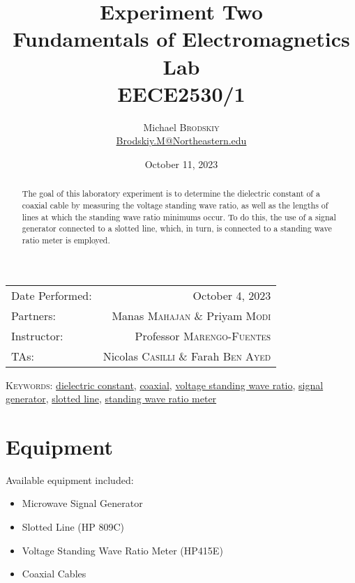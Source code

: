 \documentclass[
	letterpaper, %
	10pt, %
]{CSUniSchoolLabReport}
\title{Experiment Two\\ Fundamentals of Electromagnetics Lab \\ EECE2530/1} %
\author{Michael \textsc{Brodskiy}\\ \small \href{mailto:Brodskiy.M@Northeastern.edu}{Brodskiy.M@Northeastern.edu}}
\date{October 11, 2023} %
\begin{document}
\maketitle %

\begin{center}
	\begin{tabular}{l r}
		Date Performed: & October 4, 2023 \\ %
        Partners: & Manas \textsc{Mahajan} \& Priyam \textsc{Modi} \\ %
		Instructor: & Professor \textsc{Marengo-Fuentes} \\ %
        TAs: & Nicolas \textsc{Casilli} \& Farah \textsc{Ben Ayed} \\ %
	\end{tabular}
\end{center}

\newpage

\begin{abstract}

  The goal of this laboratory experiment is to determine the dielectric constant of a coaxial cable by measuring the voltage standing wave ratio, as well as the lengths of lines at which the standing wave ratio minimums occur. To do this, the use of a signal generator connected to a slotted line, which, in turn, is connected to a standing wave ratio meter is employed.

\end{abstract}

\begin{flushleft}

  \textsc{Keywords:} \underline{dielectric constant}, \underline{coaxial}, \underline{voltage standing wave ratio}, \underline{signal generator}, \underline{slotted line}, \underline{standing wave ratio meter}

\end{flushleft}

\newpage

\section{Equipment}

\hspace{.5 in} Available equipment included:\\

\begin{itemize}

  \item Microwave Signal Generator

  \item Slotted Line (HP 809C)

  \item Voltage Standing Wave Ratio Meter (HP415E)

  \item Coaxial Cables

\end{itemize}
\end{document}
